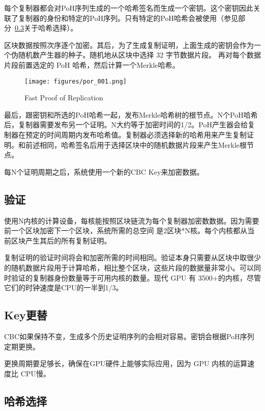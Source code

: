 \documentclass[12pt, uft8]{ctexart}
\begin{document}
每个复制器都会对PoH序列生成的一个哈希签名而生成一个密钥。这个密钥因此关联了复制器的身份和特定的PoH序列。只有特定的PoH哈希会被使用（参见部分~\ref{hashselection}关于哈希选择）。

区块数据按照次序逐个加密。其后，为了生成复制证明，上面生成的密钥会作为一个伪随机数产生器的种子。随机地从区块中选择 32 字节数据片段。
再对每个数据片段前置选定的 PoH 哈希，然后计算一个Merkle哈希。

\begin{figure}[h]
  \begin{center}
    \centering
    \texttt{[image: figures/por\_001.png]}
    \caption[Fig 8]{Fast Proof of Replication\label{fig_8}}
  \end{center}
  \end{figure}

最后，跟密钥和所选的PoH哈希一起，发布Merkle哈希树的根节点。N个PoH哈希后，复制器需要发布另一个证明。N大约等于加密时间的1/2。PoH产生器会给复制器在预定的时间周期内发布哈希值。复制器必须选择新的哈希用来产生复制证明。和前述相同，哈希签名后用于选择区块中的随机数据片段来产生Merkle根节点。

每N个证明周期之后，系统使用一个新的CBC Key来加密数据。
\subsection{验证}

使用N内核的计算设备，每核能按照区块链流为每个复制器加密数数据。因为需要前一个区块加密下一个区块，系统所需的总空间 是2区块*N核。每个内核都从当前区块产生其后的所有复制证明。

复制证明的验证时间将会和加密所需的时间相同。验证本身只需要从区块中取很少的随机数据片段用于计算哈希，相比整个区块，这些片段的数据量非常小。可以同时验证的复制器身份数量等于可用内核的数量。现代 GPU 有 3500+的内核，尽管它们的时钟速度是CPU的一半到1/3。 

\subsection{Key更替}

CBC如果保持不变，生成多个历史证明序列的会相对容易。密钥会根据PoH序列定期更换。

更换周期要足够长，确保在GPU硬件上能够实际应用，因为 GPU 内核的运算速度比 CPU慢。

\subsection{哈希选择}\label{hashselection}
\end{document}
